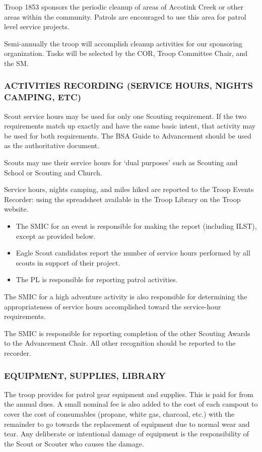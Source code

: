 \documentclass{ltxguide}
\begin{document}
Troop 1853 sponsors the periodic cleanup of areas of Accotink Creek or other areas within the community. Patrols are encouraged to use this area for patrol level service projects.

Semi-annually the troop will accomplish cleanup activities for our sponsoring organization. Tasks will be selected by the \ac{COR}, Troop Committee Chair, and the \ac{SM}.

\subsubsection{ACTIVITIES RECORDING (SERVICE HOURS, NIGHTS CAMPING, ETC)}
Scout service hours may be used for only one Scouting requirement. If the two requirements match up exactly and have the same basic intent, that activity may be used for both requirements. The \ac{BSA} Guide to Advancement should be used as the authoritative document.

Scouts may use their service hours for ‘dual purposes' such as Scouting and School or Scouting and Church.

Service hours, nights camping, and miles hiked are reported to the Troop Events Recorder: using the spreadsheet available in the Troop Library on the Troop website.

\begin{itemize}
	\item The SMIC for an event is responsible for making the report (including ILST), except as provided below.
	\item Eagle Scout candidates report the number of service hours performed by all scouts in support of their project.
	\item The \ac{PL} is responsible for reporting patrol activities.
\end{itemize}

The SMIC for a high adventure activity is also responsible for determining the appropriateness of service hours accomplished toward the service-hour requirements.

The SMIC is responsible for reporting completion of the other Scouting Awards to the Advancement Chair. All other recognition should be reported to the recorder.

\subsubsection{EQUIPMENT, SUPPLIES, LIBRARY}
The troop provides for patrol gear equipment and supplies. This is paid for from the annual dues. A small nominal fee is also added to the cost of each campout to cover the cost of consumables (propane, white gas, charcoal, etc.) with the remainder to go towards the replacement of equipment due to normal wear and tear. Any deliberate or intentional damage of equipment is the responsibility of the Scout or Scouter who causes the damage.
\end{document}
